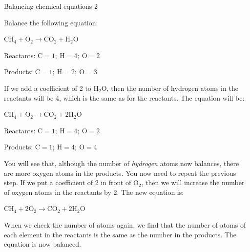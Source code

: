 \begin{wex}{Balancing chemical equations 2}{Balance the following equation:
\begin{center}
${\text{CH}_{4} + \text{O}_{2} \rightarrow \text{CO}_{2} + \text{H}_{2}\text{O}}$
\end{center}
}

{

Reactants: $\text{C} = 1;~ \text{H} = 4;~ \text{O} = 2$

Products: $\text{C} = 1;~ \text{H} = 2;~ \text{O} = 3$
}

{

If we add a coefficient of 2 to $\text{H}_{2}\text{O}$, then the number of hydrogen atoms in the reactants will be 4, which is the same as for the reactants. The equation will be:

\begin{center}
${\text{CH}_{4} + \text{O}_{2} \rightarrow \text{CO}_{2} + 2\text{H}_{2}\text{O}}$\\
\end{center}
}

{

Reactants: $\text{C} = 1;~ \text{H} = 4;~ \text{O} = 2$

Products: $\text{C} = 1;~ \text{H} = 4; ~\text{O} = 4$

You will see that, although the number of \textit{hydrogen} atoms now balances, there are more oxygen atoms in the products. You now need to repeat the previous step. If we put a coefficient of 2 in front of $\text{O}_{2}$, then we will increase the number of oxygen atoms in the reactants by 2. The new equation is:

\begin{center}
${\text{CH}_{4} + 2\text{O}_{2} \rightarrow \text{CO}_{2} + 2\text{H}_{2}\text{O}}$
\end{center}

When we check the number of atoms again, we find that the number of atoms of each element in the reactants is the same as the number in the products. The equation is now balanced.
}
\end{wex}
    \noindent
\label{m38726*secfhsst!!!underscore!!!id501}
      \noindent
\par
            \label{m38726*secfhsst!!!underscore!!!id590} 
      \noindent
